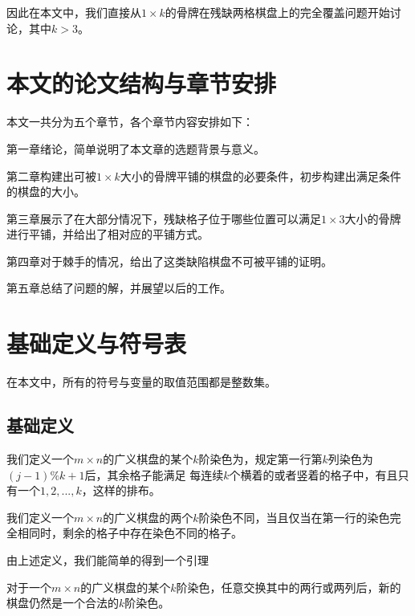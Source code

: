 因此在本文中，我们直接从$1 \times k$的骨牌在残缺两格棋盘上的完全覆盖问题开始讨论，其中$k > 3$。
\section{本文的论文结构与章节安排}

\label{sec:arrangement}

本文一共分为五个章节，各个章节内容安排如下：

第一章绪论，简单说明了本文章的选题背景与意义。

第二章构建出可被$1 \times k$大小的骨牌平铺的棋盘的必要条件，初步构建出满足条件的棋盘的大小。

第三章展示了在大部分情况下，残缺格子位于哪些位置可以满足$1 \times 3$大小的骨牌进行平铺，并给出了相对应的平铺方式。

第四章对于棘手的情况，给出了这类缺陷棋盘不可被平铺的证明。

第五章总结了问题的解，并展望以后的工作。

\section{基础定义与符号表}

在本文中，所有的符号与变量的取值范围都是整数集。

\subsection{基础定义}

\begin{definition}
    我们定义一个$m \times n$的广义棋盘的某个$k$阶染色为，规定第一行第$k$列染色为$(j - 1) \% k + 1$后，其余格子能满足
    每连续$k$个横着的或者竖着的格子中，有且只有一个$1, 2, ... , k$，这样的排布。
\end{definition}

\begin{definition}
    我们定义一个$m \times n$的广义棋盘的两个$k$阶染色不同，当且仅当在第一行的染色完全相同时，剩余的格子中存在染色不同的格子。
\end{definition}

由上述定义，我们能简单的得到一个引理
\begin{lemma}
    对于一个$m \times n$的广义棋盘的某个$k$阶染色，任意交换其中的两行或两列后，新的棋盘仍然是一个合法的$k$阶染色。
\end{lemma}


